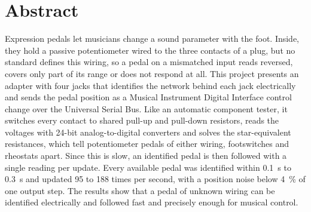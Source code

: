 
\chapter*{Abstract}

Expression pedals let musicians change a sound parameter with the foot. Inside, they hold a passive potentiometer wired to the three contacts of a plug, but no standard defines this wiring, so a pedal on a mismatched input reads reversed, covers only part of its range or does not respond at all. This project presents an adapter with four jacks that identifies the network behind each jack electrically and sends the pedal position as a Musical Instrument Digital Interface control change over the Universal Serial Bus. Like an automatic component tester, it switches every contact to shared pull-up and pull-down resistors, reads the voltages with 24-bit analog-to-digital converters and solves the star-equivalent resistances, which tell potentiometer pedals of either wiring, footswitches and rheostats apart. Since this is slow, an identified pedal is then followed with a single reading per update. Every available pedal was identified within \qty{0.1}{\second} to \qty{0.3}{\second} and updated 95 to 188 times per second, with a position noise below \qty{4}{\percent} of one output step. The results show that a pedal of unknown wiring can be identified electrically and followed fast and precisely enough for musical control.
